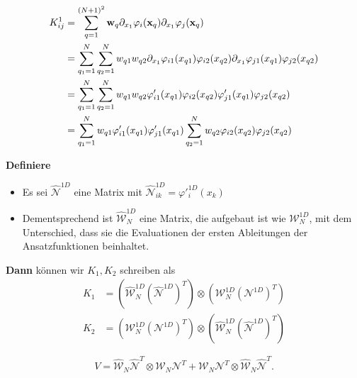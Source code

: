 \begin{frame}
\begin{equation*}
\begin{aligned}
K_{ij}^1 &=\sum\limits_{q=1}^{(N+1)^2} \bold{w}_q \partial_{x_1}  \varphi_i(\bold{x}_q)  \partial_{x_1} \varphi_j (\bold{x}_q) \\ &= \sum\limits_{q_1=1}^{N} \sum\limits_{q_2=1}^{N} w_{q1}w_{q2} \partial_{x_1}  \varphi_{i1}(x_{q1})\varphi_{i2}(x_{q2})  \partial_{x_1} \varphi_{j1} (x_{q1})\varphi_{j2} (x_{q2}) \\
&=  \sum\limits_{q_1=1}^{N} \sum\limits_{q_2=1}^{N} w_{q1}w_{q2} \varphi'_{i1}(x_{q1})\varphi_{i2}(x_{q2})  \varphi'_{j1} (x_{q1})\varphi_{j2} (x_{q2}) \\ 
&= \sum\limits_{q_1=1}^{N} w_{q1} \varphi'_{i1}(x_{q1}) \varphi'_{j1} (x_{q1}) \sum\limits_{q_2=1}^{N} w_{q2} \varphi_{i2}(x_{q2})  \varphi_{j2} (x_{q2}) 
\end{aligned}
\end{equation*}
\end{frame}

\begin{frame}
\textbf{Definiere}
\begin{itemize}
\item Es sei $\widehat{\mathcal{N}}^{1D}$ eine Matrix mit $\widehat{\mathcal{N}}^{1D}_{ik}=\varphi'^{1D}_i(x_k)$
\item Dementsprechend ist $\widehat{\mathcal{W}}^{1D}_N$ eine Matrix, die aufgebaut ist wie $\mathcal{W}^{1D}_N$, mit dem Unterschied, dass sie die Evaluationen der ersten Ableitungen der Ansatzfunktionen beinhaltet.
\end{itemize}
\pause
\textbf{Dann} können wir $K_1,K_2$ schreiben als
\begin{align*}
K_1 &= (\widehat{\mathcal{W}}_N^{1D} (\widehat{\mathcal{N}}^{1D})^T) \otimes (\mathcal{W}_N^{1D}(\mathcal{N}^{1D})^T) \\
K_2 &= (\mathcal{W}_N^{1D} (\mathcal{N}^{1D})^T) \otimes (\widehat{\mathcal{W}}_N^{1D} (\widehat{\mathcal{N}}^{1D})^T)
\end{align*}
\begin{framed}
\begin{equation*}
V =\widehat{\mathcal{W}}_N \widehat{\mathcal{N}}^T \otimes \mathcal{W}_N \mathcal{N}^{T} + \mathcal{W}_N \mathcal{N}^{T}\otimes \widehat{\mathcal{W}}_N \widehat{\mathcal{N}}^T.
\end{equation*}
\end{framed}
\end{frame}

